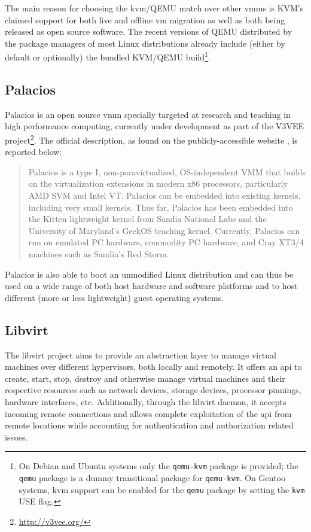 The main reason for choosing the \gls{kvm}/QEMU match over other \glspl{vmm} is KVM's claimed support for both live and offline \gls{vm} migration as well as both being released as open source software. The recent versions of QEMU distributed by the package managers of most Linux distributions already include (either by default or optionally) the bundled KVM/QEMU build\footnote{On Debian and Ubuntu systems only the \texttt{qemu-kvm} package is provided; the \texttt{qemu} package is a dummy transitional package for \texttt{qemu-kvm}. On Gentoo systems, \gls{kvm} support can be enabled for the \texttt{qemu} package by setting the \texttt{kvm} USE flag.}.


\subsection*{Palacios}
\label{sec:palacios}

Palacios is an open source \gls{vmm} specially targeted at research and teaching in high performance computing, currently under development as part of the V3VEE project\footnote{\url{http://v3vee.org/}}. The official description, as found on the publicly-accessible website \cite{palacios-www}, is reported below:

\begin{quote}
Palacios is a type I, non-paravirtualized, OS-independent VMM that builds on the virtualization extensions in modern x86 processors, particularly AMD SVM and Intel VT. Palacios can be embedded into existing kernels, including very small kernels. Thus far, Palacios has been embedded into the Kitten lightweight kernel from Sandia National Labs and the University of Maryland's GeekOS teaching kernel. Currently, Palacios can run on emulated PC hardware, commodity PC hardware, and Cray XT3/4 machines such as Sandia's Red Storm.
\end{quote}

Palacios is also able to boot an unmodified Linux distribution \cite{palacios} and can thus be used on a wide range of both host hardware and software platforms and to host different (more or less lightweight) guest operating systems.


\subsection*{Libvirt}
\label{sec:libvirt}

The libvirt project aims to provide an abstraction layer to manage virtual machines over different hypervisors, both locally and remotely. It offers an \gls{api} to create, start, stop, destroy and otherwise manage virtual machines and their respective resources such as network devices, storage devices, processor pinnings, hardware interfaces, etc. Additionally, through the libvirt daemon, it accepts incoming remote connections and allows complete exploitation of the \gls{api} from remote locations while accounting for authentication and authorization related issues.

